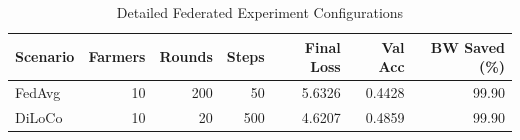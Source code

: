 \documentclass{article}
\begin{document}

\begin{table}[h]
\centering
\caption{Detailed Federated Experiment Configurations}
\label{tab:federated_details}
\begin{tabular}{lrrrrrr}
\toprule
Scenario & Farmers & Rounds & Steps & Final Loss & Val Acc & BW Saved (\%) \\
\midrule
FedAvg & 10 & 200 & 50 & 5.6326 & 0.4428 & 99.90 \\
DiLoCo & 10 & 20 & 500 & 4.6207 & 0.4859 & 99.90 \\
\bottomrule
\end{tabular}
\end{table}

\end{document}
